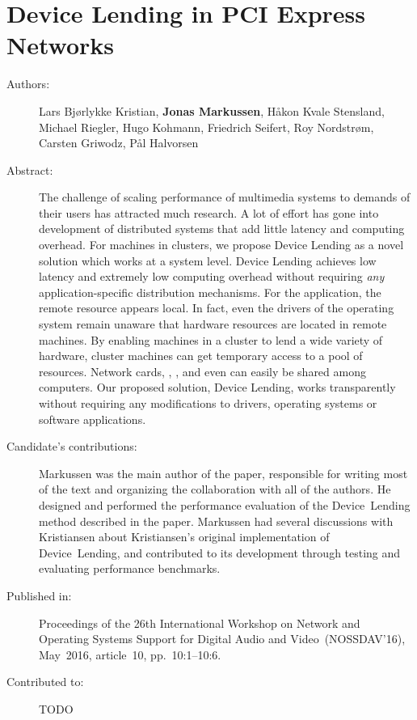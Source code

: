 \chapter{Device Lending in PCI Express Networks}
\label{paper:NOSSDAV-2016}
\paperthumb

\begin{description}
	\item[Authors:]
		Lars Bj{\o}rlykke Kristian, \textbf{Jonas Markussen}, H{\aa}kon Kvale Stensland,
		Michael Riegler, Hugo Kohmann, Friedrich Seifert, Roy Nordstr{\o}m, Carsten Griwodz, P{\aa}l Halvorsen

	\item[Abstract:]
		The challenge of scaling  performance of multimedia systems to demands
		of their users has attracted much research.
		A lot of effort has gone into
		development of distributed systems that add little latency and computing overhead.
		For machines in  clusters,
		we propose Device Lending as a novel solution which works at a system
		level.
		Device Lending achieves low latency and extremely low computing overhead without
		requiring \textit{any} application-specific distribution mechanisms.
		For the application, the remote  resource appears local.
		In fact, even the drivers of the operating system remain unaware that
		hardware resources are located in remote machines.
		By enabling machines in a  cluster to lend a wide variety of hardware, 
		cluster machines can get temporary access to a pool of  resources. 
		Network cards, , , and even  can easily 
		be shared among computers.
		Our proposed solution, Device Lending, works transparently without requiring any modifications to drivers,
		operating systems or software applications.

	\item[Candidate's contributions:]
		Markussen was the main author of the paper, responsible for writing most of the text and organizing the collaboration with 
		all of the authors. He designed and performed the performance evaluation of the Device~Lending method described in the paper.
		Markussen had several discussions with Kristiansen about Kristiansen's original implementation of Device~Lending, 
		and contributed to its development through testing and evaluating performance benchmarks.

	\item[Published in:]
		Proceedings of the 26th International Workshop on Network and Operating Systems Support for Digital Audio and Video~(NOSSDAV'16),
		May~2016, article~10, pp.~10:1--10:6.

	\item[Contributed to:]
		TODO

\end{description}
